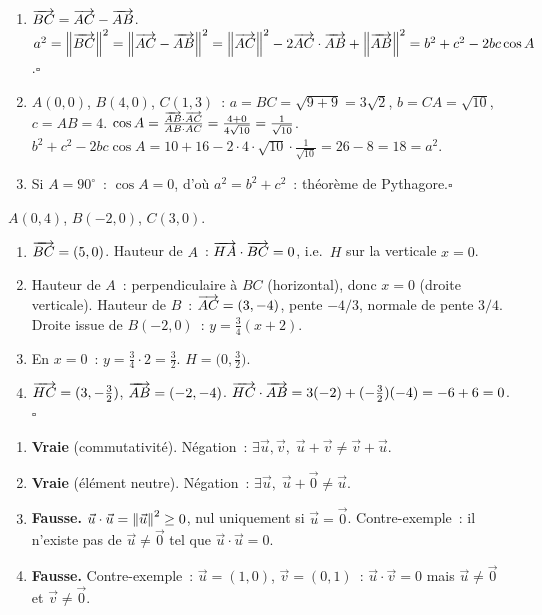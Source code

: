 
\begin{enumerate}
  \item $\overrightarrow{BC}=\overrightarrow{AC}-\overrightarrow{AB}$.
        $a^2=\left\|\overrightarrow{BC}\right\|^2=\left\|\overrightarrow{AC}-\overrightarrow{AB}\right\|^2
        =\left\|\overrightarrow{AC}\right\|^2-2\overrightarrow{AC}\cdot\overrightarrow{AB}+\left\|\overrightarrow{AB}\right\|^2
        =b^2+c^2-2bc\cos A$.\hfill$\square$
  \item $A(0,0)$, $B(4,0)$, $C(1,3)$~: $a=BC=\sqrt{9+9}=3\sqrt{2}$,
        $b=CA=\sqrt{10}$, $c=AB=4$.
        $\cos A=\frac{\overrightarrow{AB}\cdot\overrightarrow{AC}}{AB\cdot AC}=\frac{4+0}{4\sqrt{10}}=\frac{1}{\sqrt{10}}$.
        $b^2+c^2-2bc\cos A=10+16-2\cdot4\cdot\sqrt{10}\cdot\frac{1}{\sqrt{10}}=26-8=18=a^2$.\checkmark
  \item Si $A=90^{\circ}$~: $\cos A=0$, d'o\`u $a^2=b^2+c^2$~: th\'eor\`eme de Pythagore.\hfill$\square$
\end{enumerate}


$A(0,4)$, $B(-2,0)$, $C(3,0)$.
\begin{enumerate}
  \item $\overrightarrow{BC}=(5,0)$. Hauteur de $A$~: $\overrightarrow{HA}\cdot\overrightarrow{BC}=0$, i.e.\ $H$ sur la verticale $x=0$.
  \item Hauteur de $A$~: perpendiculaire \`a $BC$ (horizontal), donc $x=0$ (droite verticale).
        Hauteur de $B$~: $\overrightarrow{AC}=(3,-4)$, pente $-4/3$, normale de pente $3/4$.
        Droite issue de $B(-2,0)$~: $y=\frac{3}{4}(x+2)$.
  \item En $x=0$~: $y=\frac{3}{4}\cdot2=\frac{3}{2}$. $H=\bigl(0,\frac{3}{2}\bigr)$.
  \item $\overrightarrow{HC}=(3,-\frac{3}{2})$, $\overrightarrow{AB}=(-2,-4)$.
        $\overrightarrow{HC}\cdot\overrightarrow{AB}=3(-2)+(-\frac{3}{2})(-4)=-6+6=0$.\checkmark\hfill$\square$
\end{enumerate}


\begin{enumerate}
  \item \textbf{Vraie} (commutativit\'e).
        N\'egation~: $\exists\vec{u},\vec{v},\;\vec{u}+\vec{v}\ne\vec{v}+\vec{u}$.
  \item \textbf{Vraie} (\'el\'ement neutre).
        N\'egation~: $\exists\vec{u},\;\vec{u}+\vec{0}\ne\vec{u}$.
  \item \textbf{Fausse.} $\vec{u}\cdot\vec{u}=\left\|\vec{u}\right\|^2\geq0$, nul uniquement si $\vec{u}=\vec{0}$.
        Contre-exemple~: il n'existe pas de $\vec{u}\ne\vec{0}$ tel que $\vec{u}\cdot\vec{u}=0$.
  \item \textbf{Fausse.} Contre-exemple~: $\vec{u}=(1,0)$, $\vec{v}=(0,1)$~:
        $\vec{u}\cdot\vec{v}=0$ mais $\vec{u}\ne\vec{0}$ et $\vec{v}\ne\vec{0}$.
\end{enumerate}

